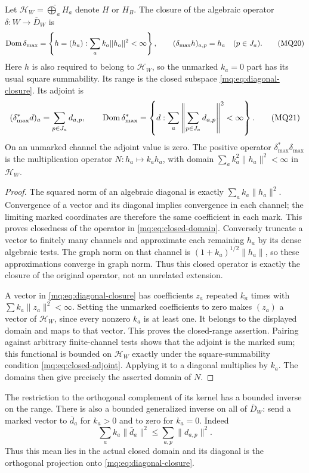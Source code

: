 \begin{theorem}
\label{mq:thm:closed-diagonal}
Let $\mathscr H_W=\widehat\bigoplus_aH_a$ denote $H$ or $H_B$.
The closure of the algebraic operator $\delta:W\to\overline D_W$
is
\[
 \operatorname{Dom}\delta_{\max}=
 \left\{h=(h_a):\sum_a k_a\|h_a\|^2<\infty\right\},
 \qquad(\delta_{\max}h)_{a,p}=h_a\quad(p\in J_a).
 \tag{MQ20}\label{mq:eq:closed-domain}
\]
Here $h$ is also required to belong to $\mathscr H_W$, so the
unmarked $k_a=0$ part has its usual square summability. Its range
is the closed subspace \eqref{mq:eq:diagonal-closure}. Its adjoint is
\[
 (\delta_{\max}^*d)_a=\sum_{p\in J_a}d_{a,p},\qquad
 \operatorname{Dom}\delta_{\max}^*=
 \left\{d:\sum_a\left\|\sum_{p\in J_a}d_{a,p}\right\|^2
                         <\infty\right\}.
 \tag{MQ21}\label{mq:eq:closed-adjoint}
\]
On an unmarked channel the adjoint value is zero. The positive
operator $\delta_{\max}^*\delta_{\max}$ is the multiplication
operator $N:h_a\mapsto k_ah_a$, with domain
$\sum_a k_a^2\|h_a\|^2<\infty$ in $\mathscr H_W$.
\end{theorem}
\begin{proof}
The squared norm of an algebraic diagonal is exactly
$\sum_a k_a\|h_a\|^2$. Convergence of a vector and its diagonal
implies convergence in each channel; the limiting marked
coordinates are therefore the same coefficient in each mark.
This proves closedness of the operator in
\eqref{mq:eq:closed-domain}. Conversely truncate a vector to finitely
many channels and approximate each remaining $h_a$ by its dense
algebraic tests. The graph norm on that channel is
$(1+k_a)^{1/2}\|h_a\|$, so these approximations converge in
graph norm. Thus this closed operator is exactly the closure of
the original operator, not an unrelated extension.

A vector in \eqref{mq:eq:diagonal-closure} has coefficients $z_a$
repeated $k_a$ times with $\sum k_a\|z_a\|^2<\infty$. Setting
the unmarked coefficients to zero makes $(z_a)$ a vector of
$\mathscr H_W$, since every nonzero $k_a$ is at least one.
It belongs to the displayed domain and maps to that vector.
This proves the closed-range assertion. Pairing against arbitrary
finite-channel tests shows that the adjoint is the marked sum;
this functional is bounded on $\mathscr H_W$ exactly under the
square-summability condition \eqref{mq:eq:closed-adjoint}. Applying
it to a diagonal multiplies by $k_a$. The domains then give
precisely the asserted domain of $N$.
\end{proof}

The restriction to the orthogonal complement of its kernel has a
bounded inverse on the range. There is also a bounded generalized
inverse on all of $\overline D_W$: send a marked vector to
$\bar d_a$ for $k_a>0$ and to zero for $k_a=0$. Indeed
\[
 \sum_a k_a\|\bar d_a\|^2\le\sum_{a,p}\|d_{a,p}\|^2.
 \tag{MQ22}\label{mq:eq:mean-bound}
\]
Thus this mean lies in the actual closed domain and its diagonal
is the orthogonal projection onto \eqref{mq:eq:diagonal-closure}.

